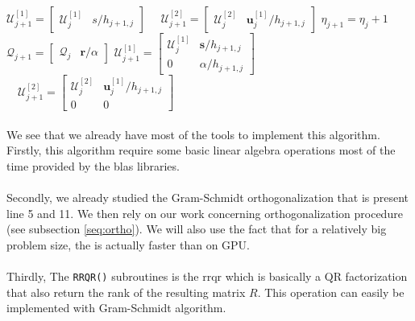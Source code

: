 \begin{algorithm}
\begin{algorithmic}[1]
     
        \State $\mathcal{U}_{j+1}^{[1]} = 
            \begin{bmatrix}
                \mathcal{U}_{j}^{[1]} & s/h_{j+1,j}
            \end{bmatrix}$
         $\quad \mathcal{U}_{j+1}^{[2]} =
            \begin{bmatrix}
            \mathcal{U}_{j}^{[2]} & \mathbf{u}_j^{[1]}/h_{j+1,j}
            \end{bmatrix}$
    \Else
        \State $\eta_{j+1} = \eta_j +1$
        \State $\mathcal{Q}_{j+1} = 
            \begin{bmatrix}
                 \mathcal{Q}_j & \mathbf{r}/\alpha 
            \end{bmatrix}$
        \State $\mathcal{U}_{j+1}^{[1]} = 
            \begin{bmatrix}
                \mathcal{U}_{j}^{[1]} & \mathbf{s}/h_{j+1,j} \\
                0  & \alpha / h_{j+1,j}
            \end{bmatrix}$
         $\quad \mathcal{U}_{j+1}^{[2]} = 
            \begin{bmatrix}
                \mathcal{U}_{j}^{[2]} & \mathbf{u}_j^{[1]}/h_{j+1,j} \\
                0  & 0
            \end{bmatrix}$
    \EndIf
\EndFor

\end{algorithmic}
\end{algorithm}

\paragraph*{}
We see that we already have most of the tools to implement this algorithm. Firstly, this algorithm require some basic linear algebra operations most of the time provided by the \acrshort{blas} libraries.

\paragraph*{}
Secondly, we already studied the Gram-Schmidt orthogonalization that is present line 5 and 11. We then rely on our work concerning orthogonalization procedure (see subsection \ref{seq:ortho}). We will also use the fact that for a relatively big problem size, the \cgsi is actually faster than \mgs on GPU.

\paragraph*{}
Thirdly, The \texttt{RRQR()} subroutines is the \acrlong{rrqr} which is basically a QR factorization that also return the rank of the resulting matrix $R$. This operation can easily be implemented with Gram-Schmidt algorithm.

